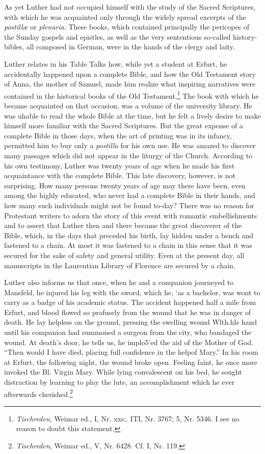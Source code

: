 As yet Luther had not occupied himself with the study of the
Sacred Scriptures, with which he was acquainted only through the
widely spread excerpts of the \textit{postillæ} or \textit{plenaria}. These books, which
contained principally the pericopes of the Sunday gospels and epistles, as well as the very sententious so-called history-bibles, all composed in German, were in the hands of the clergy and laity.

Luther relates in his Table Talks how, while yet a student at Erfurt,
he accidentally happened upon a complete Bible, and how the
Old Testament story of Anna, the mother of Samuel, made him
realize what inspiring narratives were contained in the historical
books of the Old Testament.\footnote{\textit{Tischreden}, Weimar ed., I, Nr. xxs;. ITI, Nr. 3767; 5, Nr. 5346. I see no reason to doubt this statement.}
The book with which he became acquainted on that occasion, was a volume of the university library.
He was uhable to read the whole Bible at the time, but he felt a lively
desire to make himself more familiar with the Sacred Scriptures.
But the great expense of a complete Bible in those days, when the
art of printing was in its infancy, permitted him to buy only a
\textit{postilla} for his own use. He was amazed to discover many passages
which did not appear in the liturgy of the Church. According to
his own testimony, Luther was twenty years of age when he made
his first acquaintance with the complete Bible. This late discovery,
however, is not surprising. How many persons twenty years of age
may there have been, even among the highly educated, who never
had a complete Bible in their hands, and how many such individuals
might not be found to-day? There was no reason for Protestant
writers to adorn the story of this event with romantic embellishments
and to assert that Luther then and there became the great
discoverer of the Bible, which, in the days that preceded his birth,
lay hidden under a bench and fastened to a chain. At most it was
fastened to a chain in this sense that it was secured for the sake
of safety and general utility. Even at the present day, all manuscripts
in the Laurentian Library of Florence are secured by a chain.

Luther also informs us that once, when he and a companion
journeyed to Mansfeld, he injured his leg with the sword, which he,
‘as a bachelor, was wont to carry as a badge of his academic
status. The accident happened half a mile from Erfurt, and blood
flowed so profusely from the wound that he was in danger of death.
He lay helpless on the ground, pressing the swelling wound Wlth.hls
hand until his companion had summoned a surgeon from the city,
who bandaged the wound. At death’s door, he tells us, he implo5'ed
the aid of the Mother of God. “Then would I have died, placing
full confidence in the helpof Mary.” In his room at Erfurt, the following
night, the wound broke open. Feeling faint, he once more
invoked the Bl. Virgin Mary. While lying convalescent on his bed,
he sought distraction by learning to play the lute, an accomplishment which he ever afterwards cherished.\footnote{\textit{Tischreden}, Weimar ed., V, Nr. 6428. Cf. I, Nr. 119.}

